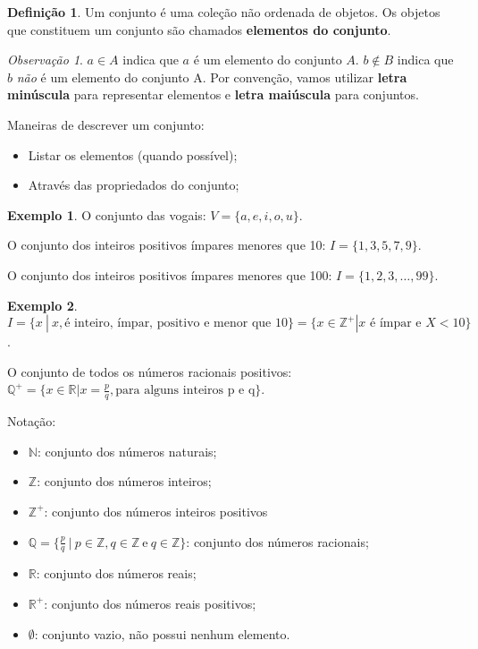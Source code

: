 \documentclass[]{book}
\providecommand{\tightlist}{%
  \setlength{\itemsep}{0pt}\setlength{\parskip}{0pt}}
\theoremstyle{definition}
\newtheorem{definition}{Definição}[chapter]
\theoremstyle{definition}
\newtheorem{example}{Exemplo}[chapter]
\theoremstyle{definition}
\theoremstyle{remark}
\newtheorem*{remark}{Observação}
\begin{document}
\begin{definition}
\protect\hypertarget{def:defConj}{}{\label{def:defConj} }Um conjunto é uma coleção não ordenada de objetos.
Os objetos que constituem um conjunto são chamados \textbf{elementos do conjunto}.
\end{definition}

\begin{remark}
\iffalse{} {Observação. } \fi{}\(a \in A\) indica que \(a\) é um elemento do conjunto \(A\).
\(b \notin B\) indica que \(b\) \emph{não} é um elemento do conjunto A.
Por convenção, vamos utilizar \textbf{letra minúscula} para representar elementos e \textbf{letra maiúscula} para conjuntos.
\end{remark}

Maneiras de descrever um conjunto:

\begin{itemize}
\tightlist
\item
  Listar os elementos (quando possível);
\item
  Através das propriedados do conjunto;
\end{itemize}

\begin{example}
\protect\hypertarget{exm:unnamed-chunk-3}{}{\label{exm:unnamed-chunk-3} }
O conjunto das vogais: \(V = \{a, e, i, o, u\}\).

O conjunto dos inteiros positivos ímpares menores que 10: \(I = \{1,3,5,7,9\}\).

O conjunto dos inteiros positivos ímpares menores que 100: \(I = \{1,2,3,\ldots,99\}\).
\end{example}

\begin{example}
\protect\hypertarget{exm:unnamed-chunk-4}{}{\label{exm:unnamed-chunk-4} }
\(I = \{x\ |\ x, \text{é inteiro, ímpar, positivo e menor que } 10 \} = \{x \in \mathbb{Z}^{+}| x \text{ é ímpar e } X < 10\}\).

O conjunto de todos os números racionais positivos: \(\mathbb{Q}^{+} = \{x \in \mathbb{R}| x = \frac{p}{q}, \text{para alguns inteiros p e q}\}\).
\end{example}

Notação:

\begin{itemize}
\tightlist
\item
  \(\mathbb{N}\): conjunto dos números naturais;
\item
  \(\mathbb{Z}\): conjunto dos números inteiros;
\item
  \(\mathbb{Z}^{+}\): conjunto dos números inteiros positivos
\item
  \(\mathbb{Q}=\{\frac{p}{q} \ | \ p \in \mathbb{Z}, q \in \mathbb{Z} \ \text{e} \ q \in \mathbb{Z} \}\): conjunto dos números racionais;
\item
  \(\mathbb{R}\): conjunto dos números reais;
\item
  \(\mathbb{R}^{+}\): conjunto dos números reais positivos;
\item
  \(\emptyset\): conjunto vazio, não possui nenhum elemento.
\end{itemize}
\end{document}
